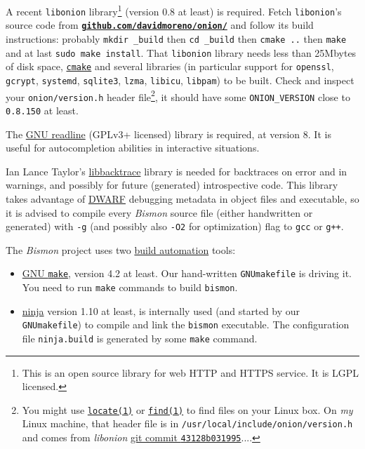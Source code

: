 A recent \texttt{libonion} library\footnote{This is an open source
  library for web HTTP and HTTPS service. It is LGPL licensed.}
(version 0.8 at least) is required. Fetch \texttt{libonion}'s source
code from
\href{https://github.com/davidmoreno/onion}{\texttt{\textbf{github.com/davidmoreno/onion/}}}
and follow its build instructions: probably \texttt{mkdir \_build} then
\texttt{cd \_build} then \texttt{cmake ..} then \texttt{make} and at
last \texttt{sudo make install}. That \texttt{libonion} library needs
less than 25Mbytes of disk space,
\href{https://cmake.org}{\texttt{cmake}} and several libraries (in
particular support for \texttt{openssl}, \texttt{gcrypt},
\texttt{systemd}, \texttt{sqlite3}, \texttt{lzma}, \texttt{libicu},
\texttt{libpam}) to be built. Check and inspect your
\texttt{onion/version.h} header file\footnote{You might use
  \href{https://man7.org/linux/man-pages/man1/locate.1.html}{\texttt{locate(1)}}
  or
  \href{https://man7.org/linux/man-pages/man1/find.1.html}{\texttt{find(1)}}
  to find files on your Linux box. On \emph{my} Linux machine, that
  header file is in \texttt{/usr/local/include/onion/version.h} and
  comes from \emph{libonion}
  \href{https://github.com/davidmoreno/onion/commit/43128b03199518d4878074c311ff71ff0018aea8}{git
    commit \texttt{43128b031995}}....}, it should have some
\texttt{ONION\_VERSION} close to \texttt{0.8.150} at least.

The \href{https://www.gnu.org/software/readline/}{GNU readline}
(GPLv3+ licensed) library is required, at version 8. It is useful for
autocompletion abilities in interactive situations.

Ian Lance Taylor's
\href{https://github.com/ianlancetaylor/libbacktrace}{libbacktrace}
library is needed for backtraces on error and in warnings, and
possibly for future (generated) introspective code. This library takes
advantage of \href{https://en.wikipedia.org/wiki/DWARF}{DWARF}
debugging metadata in object files and executable, so it is advised to
compile every \emph{Bismon} source file (either handwritten or
generated) with \texttt{-g} (and possibly also \texttt{-O2} for
optimization) flag to \texttt{gcc} or \texttt{g++}.


The \emph{Bismon} project uses two \href{https://en.wikipedia.org/wiki/Build_automation}{build automation} tools:

\begin{itemize}

\item \href{https://www.gnu.org/software/make/}{GNU \texttt{make}},
  version 4.2 at least. Our hand-written \texttt{GNUmakefile} is
  driving it. You need to run \texttt{make} commands to build
  \texttt{bismon}.

\item \href{https://ninja-build.org/}{ninja} version 1.10 at least, is
  internally used (and started by our \texttt{GNUmakefile}) to compile
  and link the \texttt{bismon} executable. The configuration file
  \texttt{ninja.build} is generated by some \texttt{make} command.

\end{itemize}
  
